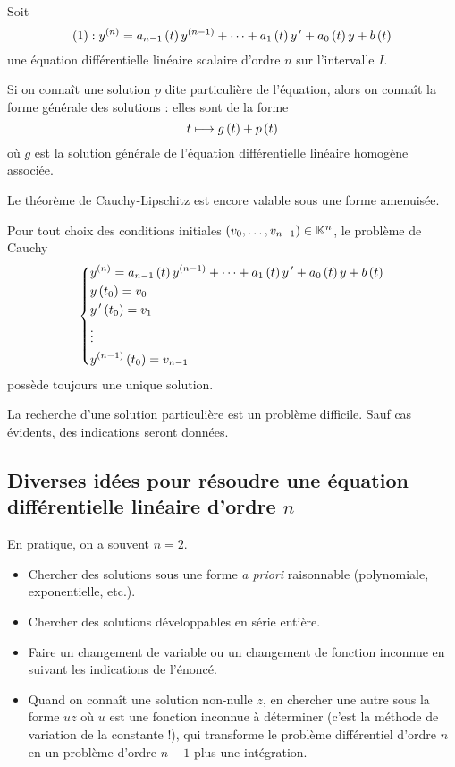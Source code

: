 \begin{prop}
Soit \[\left(1\right):y^{\left(n\right)}=a_{n-1}\left(t\right)y^{\left(n-1\right)}+\dots+a_1\left(t\right)y^{\,\prime}+a_0\left(t\right)y+b\left(t\right)\] une équation différentielle linéaire scalaire d'ordre \(n\) sur l'intervalle \(I\).

Si on connaît une solution \(p\) dite particulière de l'équation, alors on connaît la forme générale des solutions : elles sont de la forme \[t\longmapsto g\left(t\right)+p\left(t\right)\] où \(g\) est la solution générale de l'équation différentielle linéaire homogène associée.
\end{prop}

Le théorème de Cauchy-Lipschitz est encore valable sous une forme amenuisée.

\begin{theo}
Pour tout choix des conditions initiales \(\left(v_0,\dots,v_{n-1}\right)\in\mathbb{K}^n\), le problème de Cauchy \[\begin{dcases}
y^{\left(n\right)}=a_{n-1}\left(t\right)y^{\left(n-1\right)}+\dots+a_1\left(t\right)y^{\,\prime}+a_0\left(t\right)y+b\left(t\right) \\
y\left(t_0\right)=v_0 \\
y^{\,\prime}\left(t_0\right)=v_1 \\
\vdots \\
y^{\left(n-1\right)}\left(t_0\right)=v_{n-1}
\end{dcases}\] possède toujours une unique solution.
\end{theo}

\begin{rem}
La recherche d'une solution particulière est un problème difficile. Sauf cas évidents, des indications seront données.
\end{rem}

\subsection{Diverses idées pour résoudre une équation différentielle linéaire d'ordre \(n\)}

En pratique, on a souvent \(n=2\).

\begin{itemize}
    \item Chercher des solutions sous une forme \textit{a priori} raisonnable (polynomiale, exponentielle, etc.). \\
    \item Chercher des solutions développables en série entière. \\
    \item Faire un changement de variable ou un changement de fonction inconnue en suivant les indications de l'énoncé. \\
    \item Quand on connaît une solution non-nulle \(z\), en chercher une autre sous la forme \(uz\) où \(u\) est une fonction inconnue à déterminer (c'est la méthode de variation de la constante !), qui transforme le problème différentiel d'ordre \(n\) en un problème d'ordre \(n-1\) plus une intégration.
\end{itemize}

